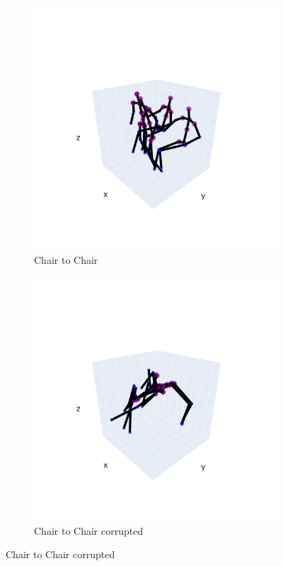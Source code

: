        \begin{figure}[h]
            \begin{subfigure}{.5\textwidth}
                \centering
                \includegraphics[width=.9\linewidth]{../src/resources/plots/movements/mov-0.png}
                \caption{Chair to Chair}
                \label{fig:mov-0}
            \end{subfigure}
            \begin{subfigure}{.5\textwidth}
                \centering
                \includegraphics[width=.9\linewidth]{../src/resources/plots/movements/mov-corrupted.png}
                \caption{Chair to Chair corrupted}
                \label{fig:mov-1}
            \end{subfigure}
            

\end{figure}
